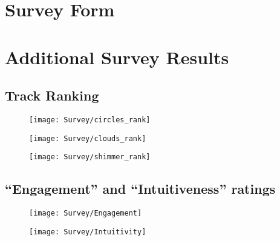 \documentclass[../initial_thesis.tex]{subfiles}
\begin{document}
\chapter{Survey Form} \label{appendix:survey}


\chapter{Additional Survey Results}
\section{Track Ranking} \label{appendix:ranking}
\begin{figure}
  \centering
  \texttt{[image: Survey/circles\_rank]}
\end{figure}
\begin{figure}
  \centering
  \texttt{[image: Survey/clouds\_rank]}
\end{figure}
\begin{figure}
  \centering
  \texttt{[image: Survey/shimmer\_rank]}
\end{figure}

\section{``Engagement'' and ``Intuitiveness'' ratings} \label{appendix:participant_ratings}
\begin{figure}
  \centering
  \texttt{[image: Survey/Engagement]}
\end{figure}
\begin{figure}
  \centering
  \texttt{[image: Survey/Intuitivity]}
\end{figure}
\end{document}

